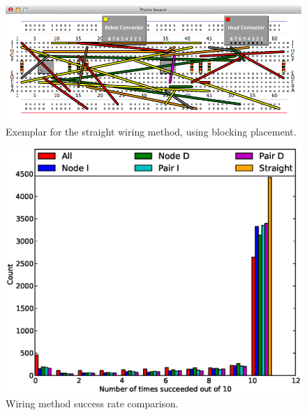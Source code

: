 \begin{figure}[H]
\begin{center}
\includegraphics[width=\textwidth]{Images/exemplar_straight_wiring.png}
\caption[Straight wiring exemplar]{Exemplar for the straight wiring method,
using blocking placement.}
\end{center}
\end{figure}

\begin{figure}[H]
\begin{center}
\includegraphics[width=15cm]{Images/wiring_success_comparison.eps}
\caption[Wiring method success rate comparison]{Wiring method success rate
comparison.}
\label{fig:wiring_success}
\end{center}
\end{figure}

